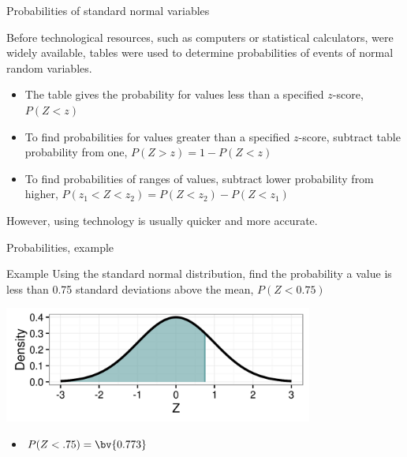 \documentclass[xcolor=table, aspectratio=169, bigger, handout]{beamer}
\begin{document}
\begin{frame}{Probabilities of standard normal variables}
\begin{block}{}
Before technological resources, such as computers or statistical calculators, were widely available, tables were used to determine probabilities of events of normal random variables.
\begin{itemize}
\pause\item The table gives the probability for values less than a specified $z$-score, $P(Z < z)$
\pause\item To find probabilities for values greater than a specified $z$-score, subtract table probability from one, $P(Z > z) = 1-P(Z<z)$
\pause\item To find probabilities of ranges of values, subtract lower probability from higher, $P(z_1 < Z < z_2) = P(Z < z_2) - P(Z < z_1)$
\end{itemize}
\medskip
\pause However, using technology is usually quicker and more accurate.
\end{block}
\end{frame}


\begin{frame}{Probabilities, example}
\begin{exampleblock}{Example}
Using the standard normal distribution, find the probability a value is less than 0.75 standard deviations above the mean, $P(Z < 0.75)$\\
\smallskip
{\centering
\includegraphics[width=4in]{../images/wk06_ex01}
\par}
\begin{itemize}
\pause\item $P(Z < .75) = \bv{0.773}$
\end{itemize}
\end{exampleblock}
\end{frame}
\end{document}
